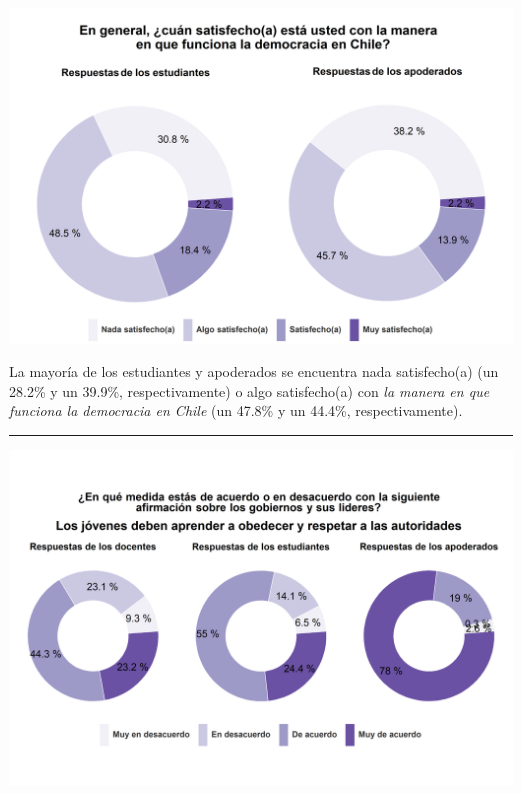 \documentclass[
  14pt,
]{book}
\let\origfigure\figure
\let\endorigfigure\endfigure
\renewenvironment{figure}[1][2] {
  \expandafter\origfigure\expandafter[H]
} {
  \endorigfigure
}
\begin{document}
\begin{figure}[!ht]

{\centering \includegraphics[width=0.8\linewidth,]{images/graph_dem} 

}

\caption{Satisfacción con la democracia}\label{fig:unnamed-chunk-41}
\end{figure}

La mayoría de los estudiantes y apoderados se encuentra nada satisfecho(a) (un 28.2\% y un 39.9\%, respectivamente) o algo satisfecho(a) con \emph{la manera en que funciona la democracia en Chile} (un 47.8\% y un 44.4\%, respectivamente).

\begin{center}\rule{0.5\linewidth}{0.5pt}\end{center}

\begin{figure}[!ht]

{\centering \includegraphics[width=0.8\linewidth,]{images/graph_aut1} 

}

\caption{Los jóvenes deben aprender a obedecer a las autoridades}\label{fig:unnamed-chunk-42}
\end{figure}
\end{document}
